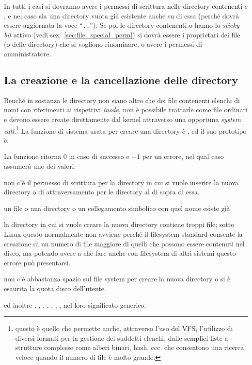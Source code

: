 In tutti i casi si dovranno avere i permessi di scrittura nelle directory
contenenti  e , e nel caso  sia
una directory vuota già esistente anche su di essa (perché dovrà essere
aggiornata la voce ``\texttt{..}''). Se poi le directory
contenenti  o  hanno lo \textit{sticky bit}
attivo (vedi sez.~\ref{sec:file_special_perm}) si dovrà essere i proprietari
dei file (o delle directory) che si vogliono rinominare, o avere i permessi di
amministratore.


\subsection{La creazione e la cancellazione delle directory} 
\label{sec:file_dir_creat_rem}

Benché in sostanza le directory non siano altro che dei file contenenti
elenchi di nomi con riferimenti ai rispettivi \textit{inode}, non è possibile
trattarle come file ordinari e devono essere create direttamente dal kernel
attraverso una opportuna \textit{system call}.\footnote{questo è quello che
  permette anche, attraverso l'uso del VFS, l'utilizzo di diversi formati per
  la gestione dei suddetti elenchi, dalle semplici liste a strutture complesse
  come alberi binari, hash, ecc. che consentono una ricerca veloce quando il
  numero di file è molto grande.}  La funzione di sistema usata per creare una
directory è , ed il suo prototipo è:

\begin{funcproto}{
}
{La funzione ritorna $0$ in caso di successo e $-1$ per un errore, nel qual
  caso  assumerà uno dei valori: 
  \begin{errlist}
  \item[\errcode{EACCES}] non c'è il permesso di scrittura per la directory in
    cui si vuole inserire la nuova directory o di attraversamento per le
    directory al di sopra di essa.
  \item[\errcode{EEXIST}] un file o una directory o un collegamento simbolico
    con quel nome esiste già.
  \item[\errcode{EMLINK}] la directory in cui si vuole creare la nuova
    directory contiene troppi file; sotto Linux questo normalmente non avviene
    perché il filesystem standard consente la creazione di un numero di file
    maggiore di quelli che possono essere contenuti nel disco, ma potendo
    avere a che fare anche con filesystem di altri sistemi questo errore può
    presentarsi.
  \item[\errcode{ENOSPC}] non c'è abbastanza spazio sul file system per creare
    la nuova directory o si è esaurita la quota disco dell'utente.
  \end{errlist}
  ed inoltre , , ,
  , , , ,
   nel loro significato generico.}
\end{funcproto}

